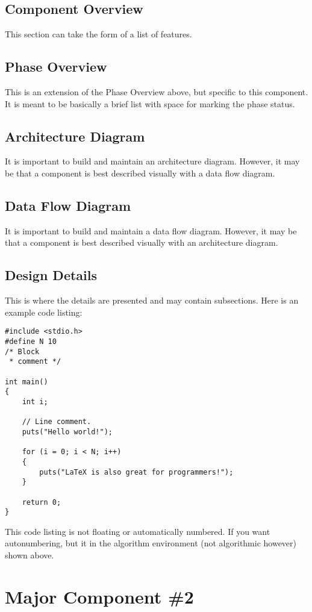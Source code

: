 \subsection{Component  Overview}
This section can take the form of a list of features. 

\subsection{Phase Overview}
This is an extension of the Phase Overview above, but specific to this component. 
 It is meant to be basically a brief list with space for marking the phase status. 

\subsection{ Architecture  Diagram}
It is important to build and maintain an architecture diagram.  However, it may 
be that a component is best described visually with a data flow diagram. 


\subsection{Data Flow Diagram}
It is important to build and maintain a data flow diagram.  However, it may be 
that a component is best described visually with an architecture diagram. 


\subsection{Design Details}
This is where the details are presented and may contain subsections.   Here is an example code listing:
\begin{lstlisting}
#include <stdio.h>
#define N 10
/* Block
 * comment */
 
int main()
{
    int i;
 
    // Line comment.
    puts("Hello world!");
 
    for (i = 0; i < N; i++)
    {
        puts("LaTeX is also great for programmers!");
    }
 
    return 0;
}
\end{lstlisting}
This code listing is not floating or automatically numbered.  If you want autonumbering, but it in the algorithm environment (not algorithmic however) shown above.



\section{Major Component \#2 }


